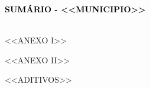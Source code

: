 \documentclass[
]{article}
\author{}
\date{}
\newcommand{\TituloSumarioFonte}{\sffamily\bfseries\Large}
\newcommand{\TituloSumarioCor}{black}
\begin{document}
{\TituloSumarioFonte\textcolor{\TituloSumarioCor}{SUMÁRIO - <<MUNICIPIO>>}}\\

\strut \\

<<ANEXO I>>

<<ANEXO II>>

<<ADITIVOS>>
\end{document}
